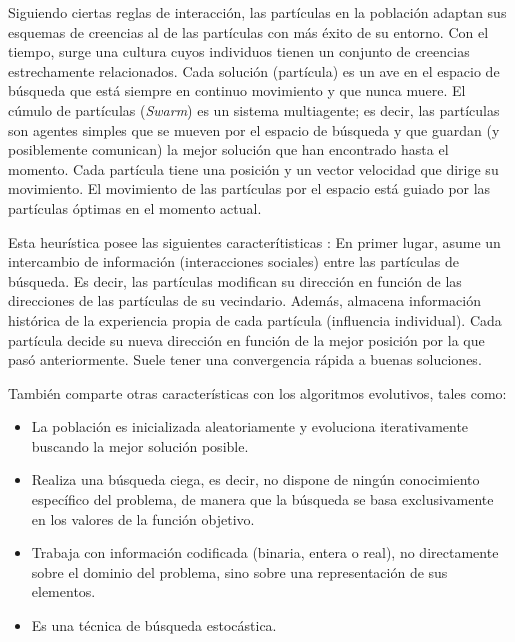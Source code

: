   Siguiendo ciertas reglas de interacci\'on, las part\'iculas en la poblaci\'on adaptan sus esquemas de creencias al de las part\'iculas 
  con m\'as \'exito de su entorno. Con el tiempo, surge una cultura cuyos individuos tienen un conjunto de creencias estrechamente 
  relacionados. Cada soluci\'on (part\'icula) es un ave en el espacio de b\'usqueda que est\'a 
  siempre en continuo movimiento y que nunca muere. El c\'umulo de part\'iculas (\textit{Swarm}) es un sistema multiagente; es decir, 
  las part\'iculas son agentes simples que se mueven por el espacio de b\'usqueda y que guardan (y posiblemente comunican) la mejor soluci\'on 
  que han encontrado hasta el momento. Cada part\'icula tiene una posici\'on y un vector velocidad que dirige su movimiento. El movimiento 
  de las part\'iculas por el espacio est\'a guiado por las part\'iculas \'optimas en el momento actual.
  
  Esta heur\'istica posee las siguientes caracter\'itisticas \cite{JKRBParticle}: En primer lugar, asume un intercambio de informaci\'on 
  (interacciones sociales) entre las part\'iculas de b\'usqueda. Es decir, las part\'iculas modifican su direcci\'on en funci\'on 
  de las direcciones de las part\'iculas de su vecindario. Adem\'as, almacena informaci\'on hist\'orica de la experiencia propia 
  de cada part\'icula (influencia individual). Cada part\'icula decide su nueva direcci\'on en funci\'on de la mejor posici\'on 
  por la que pas\'o anteriormente. Suele tener una convergencia r\'apida a buenas soluciones.
  
  Tambi\'en comparte otras caracter\'isticas con los algoritmos evolutivos, tales como:
  
  \begin{itemize}
   \item La poblaci\'on es inicializada aleatoriamente y evoluciona iterativamente buscando la mejor soluci\'on posible.
   \item Realiza una b\'usqueda ciega, es decir, no dispone de ning\'un conocimiento espec\'ifico del problema, de manera 
   que la b\'usqueda se basa exclusivamente en los valores de la funci\'on objetivo.
   \item Trabaja con informaci\'on codificada (binaria, entera o real), no directamente sobre el dominio del problema, sino sobre 
   una representaci\'on de sus elementos.
   \item Es una t\'ecnica de b\'usqueda estoc\'astica.
  \end{itemize}

